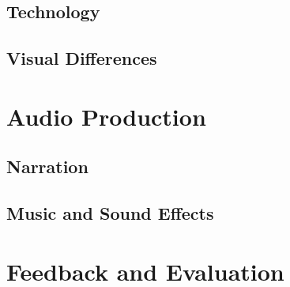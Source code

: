 \subsection{Technology}
\subsection{Visual Differences}

\section{Audio Production}

\subsection{Narration}
\subsection{Music and Sound Effects}

\section{Feedback and Evaluation}

